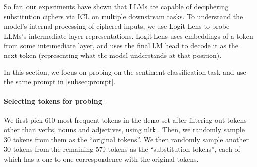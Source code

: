 \documentclass[11pt]{article}
\newcommand{\muhan}[1]{{\color{green}[{\bf Muhan}: #1]}}
\begin{document}




So far, our experiments have shown that LLMs are capable of deciphering substitution ciphers via ICL on multiple downstream tasks.
To understand the model's internal processing of ciphered inputs, we use Logit Lens \cite{logitlens} to probe LLMs's intermediate layer representations.
Logit Lens uses embeddings of a token from some intermediate layer, and uses the final LM head to decode it as the next token (representing what the model understands at that position).

In this section, we focus on probing on the sentiment classification task and use the same prompt in \ref{subsec:prompt}.
\paragraph{Selecting tokens for probing:}
We first pick 600 most frequent tokens in the demo set after filtering out tokens other than verbs, nouns and adjectives, using nltk \cite{bird2009natural}.
Then, we randomly sample 30 tokens from them as the ``original tokens''.
We then randomly sample another 30 tokens from the remaining 570 tokens as the ``substitution tokens'', each of which has a one-to-one correspondence with the original tokens.
\end{document}
